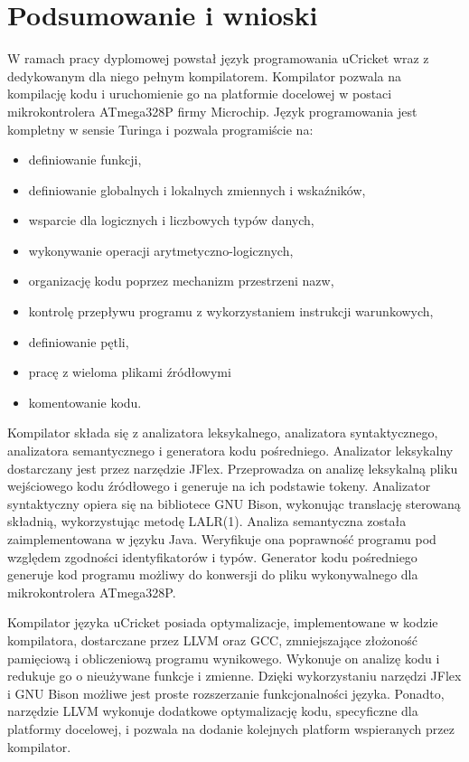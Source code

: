 \chapter{Podsumowanie i wnioski}
\label{ch:07}
W ramach pracy dyplomowej powstał język programowania uCricket wraz z dedykowanym dla niego pełnym kompilatorem. Kompilator pozwala na kompilację kodu i uruchomienie go na platformie docelowej w postaci mikrokontrolera ATmega328P firmy Microchip.
Język programowania jest kompletny w sensie Turinga i pozwala programiście na:
\begin{itemize}
\item definiowanie funkcji,
\item definiowanie globalnych i lokalnych zmiennych i wskaźników,
\item wsparcie dla logicznych i liczbowych typów danych,
\item wykonywanie operacji arytmetyczno-logicznych,
\item organizację kodu poprzez mechanizm przestrzeni nazw,
\item kontrolę przepływu programu z wykorzystaniem instrukcji warunkowych,
\item definiowanie pętli,
\item pracę z wieloma plikami źródłowymi
\item komentowanie kodu.
\end{itemize}

Kompilator składa się z analizatora leksykalnego, analizatora syntaktycznego, analizatora semantycznego i generatora kodu pośredniego.
Analizator leksykalny dostarczany jest przez narzędzie JFlex. Przeprowadza on analizę leksykalną pliku wejściowego kodu źródłowego i generuje na ich podstawie tokeny. Analizator syntaktyczny opiera się na bibliotece GNU Bison, wykonując translację sterowaną składnią, wykorzystując metodę LALR(1). Analiza semantyczna została zaimplementowana w języku Java. Weryfikuje ona poprawność programu pod względem zgodności identyfikatorów i typów. Generator kodu pośredniego generuje kod programu możliwy do konwersji do pliku wykonywalnego dla mikrokontrolera ATmega328P.

Kompilator języka uCricket posiada optymalizacje, implementowane w kodzie kompilatora, dostarczane przez LLVM oraz GCC, zmniejszające złożoność pamięciową i obliczeniową programu wynikowego. Wykonuje on analizę kodu i redukuje go o nieużywane funkcje i zmienne. 
Dzięki wykorzystaniu narzędzi JFlex i GNU Bison możliwe jest proste rozszerzanie funkcjonalności języka. Ponadto, narzędzie LLVM wykonuje dodatkowe optymalizację kodu, specyficzne dla platformy docelowej, i pozwala na dodanie kolejnych platform wspieranych przez kompilator.

